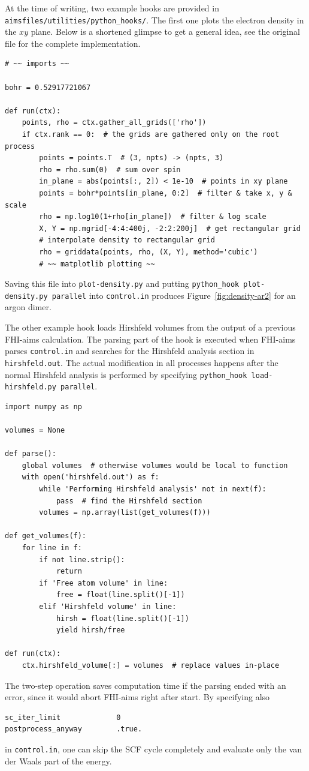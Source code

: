 At the time of writing, two example hooks are provided in
\verb+aimsfiles/utilities/python_hooks/+.
The first one plots the electron density in the $xy$ plane.
Below is a shortened glimpse to get a general idea, see the original file for
the complete implementation.
\begin{verbatim}
# ~~ imports ~~

bohr = 0.52917721067

def run(ctx):
    points, rho = ctx.gather_all_grids(['rho'])
    if ctx.rank == 0:  # the grids are gathered only on the root process
        points = points.T  # (3, npts) -> (npts, 3)
        rho = rho.sum(0)  # sum over spin
        in_plane = abs(points[:, 2]) < 1e-10  # points in xy plane
        points = bohr*points[in_plane, 0:2]  # filter & take x, y & scale
        rho = np.log10(1+rho[in_plane])  # filter & log scale
        X, Y = np.mgrid[-4:4:400j, -2:2:200j]  # get rectangular grid
        # interpolate density to rectangular grid
        rho = griddata(points, rho, (X, Y), method='cubic')
        # ~~ matplotlib plotting ~~
\end{verbatim}
Saving this file into \verb+plot-density.py+ and putting
\verb+python_hook plot-density.py parallel+ into \verb+control.in+ produces
Figure~\ref{fig:density-ar2} for an argon dimer.

The other example hook loads Hirshfeld volumes from the output of a previous
FHI-aims calculation.
The parsing part of the hook is executed when FHI-aims parses \verb+control.in+ and
searches for the Hirshfeld analysis section in \verb+hirshfeld.out+.
The actual modification in all processes happens after the normal Hirshfeld
analysis is performed by specifying \verb+python_hook load-hirshfeld.py parallel+.
\begin{verbatim}
import numpy as np

volumes = None

def parse():
    global volumes  # otherwise volumes would be local to function
    with open('hirshfeld.out') as f:
        while 'Performing Hirshfeld analysis' not in next(f):
            pass  # find the Hirshfeld section
        volumes = np.array(list(get_volumes(f)))

def get_volumes(f):
    for line in f:
        if not line.strip():
            return
        if 'Free atom volume' in line:
            free = float(line.split()[-1])
        elif 'Hirshfeld volume' in line:
            hirsh = float(line.split()[-1])
            yield hirsh/free

def run(ctx):
    ctx.hirshfeld_volume[:] = volumes  # replace values in-place
\end{verbatim}
The two-step operation saves computation time if the parsing ended with an
error, since it would abort FHI-aims right after start.
By specifying also
\begin{verbatim}
sc_iter_limit             0
postprocess_anyway        .true.
\end{verbatim}
in \verb+control.in+, one can skip the SCF cycle completely and evaluate
only the van der Waals part of the energy.

